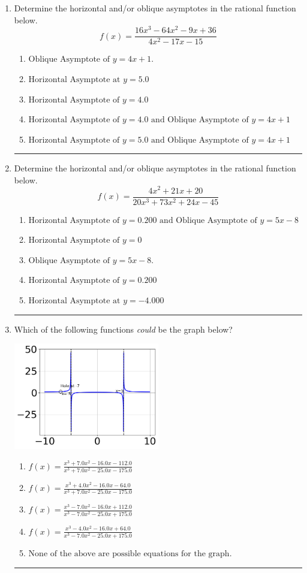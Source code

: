 \documentclass[14pt]{extbook}
\newcommand{\litem}[1]{\item#1\hspace*{-1cm}\rule{\textwidth}{0.4pt}}
\begin{document}
\begin{enumerate}
{\begin{enumerate}[label=\Alph*.]
\end{enumerate} }
\litem{
Determine the horizontal and/or oblique asymptotes in the rational function below.\[ f(x) = \frac{16x^{3} -64 x^{2} -9 x + 36}{4x^{2} -17 x -15} \]\begin{enumerate}[label=\Alph*.]
\item \( \text{Oblique Asymptote of } y = 4x + 1. \)
\item \( \text{Horizontal Asymptote at } y = 5.0 \)
\item \( \text{Horizontal Asymptote of } y = 4.0  \)
\item \( \text{Horizontal Asymptote of } y = 4.0 \text{ and Oblique Asymptote of } y = 4x + 1 \)
\item \( \text{Horizontal Asymptote of } y = 5.0 \text{ and Oblique Asymptote of } y = 4x + 1 \)

\end{enumerate} }
\litem{
Determine the horizontal and/or oblique asymptotes in the rational function below.\[ f(x) = \frac{4x^{2} +21 x + 20}{20x^{3} +73 x^{2} +24 x -45} \]\begin{enumerate}[label=\Alph*.]
\item \( \text{Horizontal Asymptote of } y = 0.200 \text{ and Oblique Asymptote of } y = 5x -8 \)
\item \( \text{Horizontal Asymptote of } y = 0 \)
\item \( \text{Oblique Asymptote of } y = 5x -8. \)
\item \( \text{Horizontal Asymptote of } y = 0.200  \)
\item \( \text{Horizontal Asymptote at } y = -4.000 \)

\end{enumerate} }
\litem{
Which of the following functions \textit{could} be the graph below?
\begin{center}
    \includegraphics[width=0.5\textwidth]{../Figures/identifyGraphOfRationalFunctionA.png}
\end{center}
\begin{enumerate}[label=\Alph*.]
\item \( f(x)=\frac{x^{3} +7.0 x^{2} -16.0 x -112.0}{x^{3} +7.0 x^{2} -25.0 x -175.0} \)
\item \( f(x)=\frac{x^{3} +4.0 x^{2} -16.0 x -64.0}{x^{3} +7.0 x^{2} -25.0 x -175.0} \)
\item \( f(x)=\frac{x^{3} -7.0 x^{2} -16.0 x + 112.0}{x^{3} -7.0 x^{2} -25.0 x + 175.0} \)
\item \( f(x)=\frac{x^{3} -4.0 x^{2} -16.0 x + 64.0}{x^{3} -7.0 x^{2} -25.0 x + 175.0} \)
\item \( \text{None of the above are possible equations for the graph.} \)


\end{enumerate}}
\end{enumerate}
\end{document}
